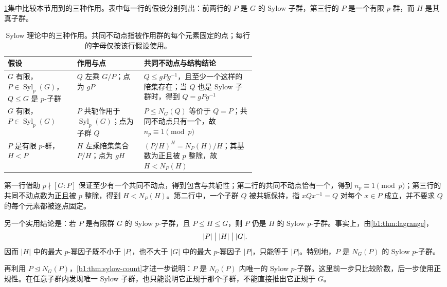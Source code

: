 \ProseParagraphBreak
\cref{b1:tab:sylow-actions}集中比较本节用到的三种作用。表中每一行的假设分别列出：前两行的 \(P\) 是 \(G\) 的 Sylow 子群，第三行的 \(P\) 是一个有限 \(p\)-群，而 \(H\) 是其真子群。

\begin{table}[htbp]
	\centering
	\caption[Sylow 理论中的三种作用]{Sylow 理论中的三种作用。共同不动点指被作用群的每个元素固定的点；每行的字母仅按该行假设使用。}
	\label{b1:tab:sylow-actions}
	\begin{tabularx}{\linewidth}{@{}>{\raggedright\arraybackslash}p{0.29\linewidth}>{\raggedright\arraybackslash}p{0.27\linewidth}>{\raggedright\arraybackslash}X@{}}
		\toprule
		假设 & 作用与点 & 共同不动点与结构结论 \\
		\midrule
		\(G\) 有限，\(P\in\operatorname{Syl}_p(G)\)，\(Q\leq G\) 是 \(p\)-子群 & \(Q\) 左乘 \(G/P\)；点为 \(gP\) & \(Q\leq gPg^{-1}\)，且至少一个这样的陪集存在；当 \(Q\) 也是 Sylow 子群时，得到 \(Q=gPg^{-1}\) \\
		\addlinespace
		\(G\) 有限，\(P\in\operatorname{Syl}_p(G)\) & \(P\) 共轭作用于 \(\operatorname{Syl}_p(G)\)；点为子群 \(Q\) & \(P\leq N_G(Q)\) 等价于 \(Q=P\)；共同不动点只有一个，故 \(n_p\equiv1\pmod p\) \\
		\addlinespace
		\(P\) 是有限 \(p\)-群，\(H<P\) & \(H\) 左乘陪集集合 \(P/H\)；点为 \(gH\) & \((P/H)^H=N_P(H)/H\)；其基数为正且被 \(p\) 整除，故 \(H<N_P(H)\) \\
		\bottomrule
	\end{tabularx}
\end{table}

第一行借助 \(p\nmid[G:P]\) 保证至少有一个共同不动点，得到包含与共轭性；第二行的共同不动点恰有一个，得到 \(n_p\equiv1\pmod p\)；第三行的共同不动点数为正且被 \(p\) 整除，得到 \(H<N_P(H)\)。第二行中，一个子群 \(Q\) 被共轭保持，指 \(xQx^{-1}=Q\) 对每个 \(x\in P\) 成立，并不要求 \(Q\) 的每个元素都被逐点固定。

\ProseParagraphBreak
另一个实用结论是：若 \(P\) 是有限群 \(G\) 的 Sylow \(p\)-子群，且 \(P\leq H\leq G\)，则 \(P\) 仍是 \(H\) 的 Sylow \(p\)-子群。事实上，由\cref{b1:thm:lagrange}，
\[
	|P|\bigm\vert|H|\bigm\vert|G|.
\]
因而 \(|H|\) 中的最大 \(p\)-幂因子既不小于 \(|P|\)，也不大于 \(|G|\) 中的最大 \(p\)-幂因子 \(|P|\)，只能等于 \(|P|\)。特别地，\(P\) 是 \(N_G(P)\) 的 Sylow \(p\)-子群。

\ProseParagraphBreak
再利用 \(P\trianglelefteq N_G(P)\)，\cref{b1:thm:sylow-count}才进一步说明：\(P\) 是 \(N_G(P)\) 内唯一的 Sylow \(p\)-子群。这里前一步只比较阶数，后一步使用正规性。在任意子群内发现唯一 Sylow 子群，也只能说明它正规于那个子群，不能直接推出它正规于 \(G\)。
